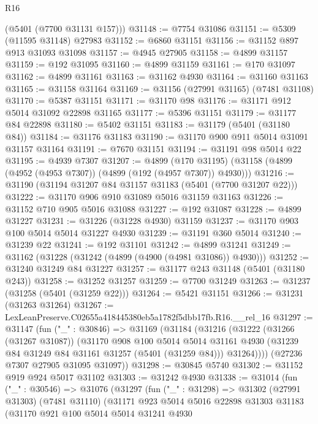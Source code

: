 \begin{lexlean}{R16}
\begin{coremodule}
      (@5401 (@7700 @31131 @157)))
@31148 := @7754 @31086
@31151 := @5309 (@11595 @31148) @27983
@31152 := @6860 @31151
@31156 := @31152 @897 @913 @31093 @31098
@31157 := @4945 @27905
@31158 := @4899 @31157
@31159 := @192 @31095
@31160 := @4899 @31159
@31161 := @170 @31097
@31162 := @4899 @31161
@31163 := @31162 @4930
@31164 := @31160 @31163
@31165 := @31158 @31164
@31169 := @31156 (@27991 @31165) (@7481 @31108)
@31170 := @5387 @31151
@31171 := @31170 @98
@31176 := @31171 @912 @5014 @31092 @22898 @31165
@31177 := @5396 @31151
@31179 := @31177 @84 @22898
@31180 := @5402 @31151
@31183 := @31179 (@5401 (@31180 @84))
@31184 := @31176 @31183
@31190 := @31170 @900 @911 @5014 @31091 @31157 @31164
@31191 := @7670 @31151
@31194 := @31191 @98 @5014 @22
@31195 := @4939 @7307
@31207 := @4899
    (@170 @31195)
    (@31158 (@4899 (@4952 (@4953 @7307)) (@4899 (@192 (@4957 @7307)) @4930)))
@31216 := @31190 (@31194 @31207 @84 @31157 @31183 (@5401 (@7700 @31207 @22)))
@31222 := @31170 @906 @910 @31089 @5016 @31159 @31163
@31226 := @31152 @710 @905 @5016 @31088
@31227 := @192 @31087
@31228 := @4899 @31227
@31231 := @31226 (@31228 @4930) @31159
@31237 := @31170 @903 @100 @5014 @5014 @31227 @4930
@31239 := @31191 @360 @5014
@31240 := @31239 @22
@31241 := @192 @31101
@31242 := @4899 @31241
@31249 := @31162 (@31228 (@31242 (@4899 (@4900 (@4981 @31086)) @4930)))
@31252 := @31240 @31249 @84 @31227
@31257 := @31177 @243 @31148 (@5401 (@31180 @243))
@31258 := @31252 @31257
@31259 := @7700 @31249
@31263 := @31237 (@31258 (@5401 (@31259 @22)))
@31264 := @5421 @31151
@31266 := @31231 (@31263 @31264)
@31267 := LexLeanPreserve.C02655a418445380eb5a1782f5dbb17fb.R16.__rel_16
@31297 := @31147
    (fun ("_" : @30846) =>
    @31169
      (@31184
        (@31216
          (@31222
            (@31266 (@31267 @31087))
            (@31170
              @908
              @100
              @5014
              @5014
              @31161
              @4930
              (@31239 @84 @31249 @84 @31161 @31257 (@5401 (@31259 @84)))
              @31264))))
      (@27236 @7307 @27905 @31095 @31097))
@31298 := @30845 @5740
@31302 := @31152 @919 @924 @5017 @31102
@31303 := @31242 @4930
@31338 := @31014
    (fun ("_" : @30546) =>
    @31076
      (@31297
        (fun ("_" : @31298) =>
        @31302
          (@27991 @31303)
          (@7481 @31110)
          (@31171
            @923
            @5014
            @5016
            @22898
            @31303
            @31183
            (@31170
              @921
              @100
              @5014
              @5014
              @31241
              @4930

\end{coremodule}
\end{lexlean}
